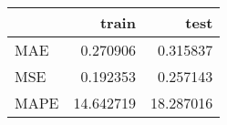 \begin{tabular}{lrr}
\toprule
{} &      train &       test \\
\midrule
MAE  &   0.270906 &   0.315837 \\
MSE  &   0.192353 &   0.257143 \\
MAPE &  14.642719 &  18.287016 \\
\bottomrule
\end{tabular}
